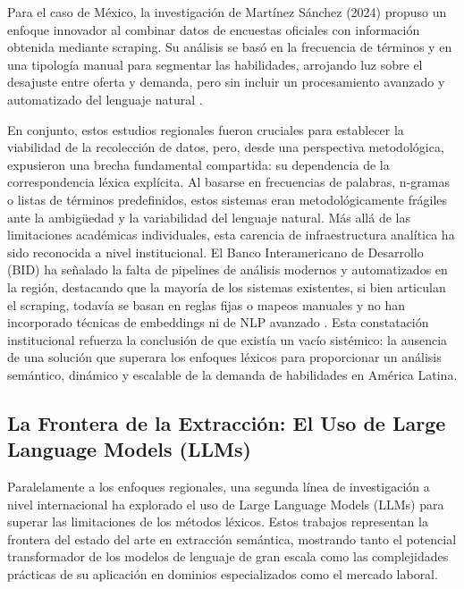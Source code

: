 Para el caso de México, la investigación de Martínez Sánchez (2024) propuso un enfoque innovador al combinar datos de encuestas oficiales con información obtenida mediante scraping. Su análisis se basó en la frecuencia de términos y en una tipología manual para segmentar las habilidades, arrojando luz sobre el desajuste entre oferta y demanda, pero sin incluir un procesamiento avanzado y automatizado del lenguaje natural \parencite{martinez2024}.

En conjunto, estos estudios regionales fueron cruciales para establecer la viabilidad de la recolección de datos, pero, desde una perspectiva metodológica, expusieron una brecha fundamental compartida: su dependencia de la correspondencia léxica explícita. Al basarse en frecuencias de palabras, n-gramas o listas de términos predefinidos, estos sistemas eran metodológicamente frágiles ante la ambigüedad y la variabilidad del lenguaje natural. Más allá de las limitaciones académicas individuales, esta carencia de infraestructura analítica ha sido reconocida a nivel institucional. El Banco Interamericano de Desarrollo (BID) ha señalado la falta de pipelines de análisis modernos y automatizados en la región, destacando que la mayoría de los sistemas existentes, si bien articulan el scraping, todavía se basan en reglas fijas o mapeos manuales y no han incorporado técnicas de embeddings ni de NLP avanzado \parencite{echeverria2022}. Esta constatación institucional refuerza la conclusión de que existía un vacío sistémico: la ausencia de una solución que superara los enfoques léxicos para proporcionar un análisis semántico, dinámico y escalable de la demanda de habilidades en América Latina.

\subsection{La Frontera de la Extracción: El Uso de Large Language Models (LLMs)}

Paralelamente a los enfoques regionales, una segunda línea de investigación a nivel internacional ha explorado el uso de Large Language Models (LLMs) para superar las limitaciones de los métodos léxicos. Estos trabajos representan la frontera del estado del arte en extracción semántica, mostrando tanto el potencial transformador de los modelos de lenguaje de gran escala como las complejidades prácticas de su aplicación en dominios especializados como el mercado laboral.

